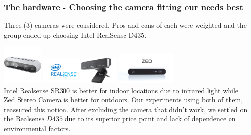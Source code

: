 \documentclass{beamer}
\begin{document}
\begin{frame}
\frametitle{The hardware - Choosing the camera fitting our needs best} %

Three (3) cameras were considered. Pros and cons of each were weighted and the group ended up choosing Intel RealSense D435.

\includegraphics[width = 2cm]{Figures/Realsense1}
\includegraphics[width = 4cm]{Figures/intel2} \hspace{1cm}
\includegraphics[width = 3cm]{Figures/ZED} \hspace{2cm}
\\ Intel Realsense SR$300$ is better for indoor locations due to infrared light while Zed Stereo Camera is better for outdoors. Our experiments using both of them, reassured this notion. After excluding the camera that didn't work, we settled on the Realsense $D435$ due to its superior price point and lack of dependence on environmental factors.




\end{frame}
\end{document}
